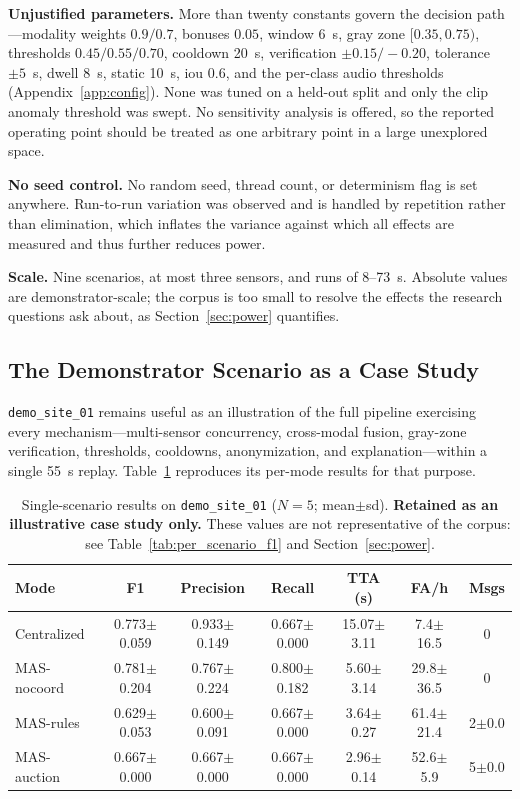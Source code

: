 \textbf{Unjustified parameters.} More than twenty constants govern the decision path---modality weights $0.9/0.7$, bonuses $0.05$, window 6~s, gray zone $[0.35,0.75)$, thresholds $0.45/0.55/0.70$, cooldown 20~s, verification $\pm0.15/-0.20$, tolerance $\pm5$~s, dwell 8~s, static 10~s, \gls{iou} 0.6, and the per-class audio thresholds (Appendix~\ref{app:config}). None was tuned on a held-out split and only the \gls{clip} anomaly threshold was swept. No sensitivity analysis is offered, so the reported operating point should be treated as one arbitrary point in a large unexplored space.

\textbf{No seed control.} No random seed, thread count, or determinism flag is set anywhere. Run-to-run variation was observed and is handled by repetition rather than elimination, which inflates the variance against which all effects are measured and thus further reduces power.

\textbf{Scale.} Nine scenarios, at most three sensors, and runs of 8--73~s. Absolute values are demonstrator-scale; the corpus is too small to resolve the effects the research questions ask about, as Section~\ref{sec:power} quantifies.

\subsection{The Demonstrator Scenario as a Case Study}
\label{sec:demo_case}

\texttt{demo\_site\_01} remains useful as an illustration of the full pipeline exercising every mechanism---multi-sensor concurrency, cross-modal fusion, gray-zone verification, thresholds, cooldowns, anonymization, and explanation---within a single 55~s replay. Table~\ref{tab:ablation} reproduces its per-mode results for that purpose.

\begin{table}[H]
	\centering
	\caption{Single-scenario results on \texttt{demo\_site\_01} ($N=5$; mean$\pm$sd). \textbf{Retained as an illustrative case study only.} These values are not representative of the corpus: see Table~\ref{tab:per_scenario_f1} and Section~\ref{sec:power}.}
	\label{tab:ablation}
	\small
	\begin{tabular}{lcccccc}
		\toprule
		\textbf{Mode} & \textbf{F1}     & \textbf{Precision} & \textbf{Recall} & \textbf{TTA (s)} & \textbf{FA/h} & \textbf{Msgs} \\
		\midrule
		Centralized   & 0.773$\pm$0.059 & 0.933$\pm$0.149    & 0.667$\pm$0.000 & 15.07$\pm$3.11   & 7.4$\pm$16.5  & 0             \\
		MAS-nocoord   & 0.781$\pm$0.204 & 0.767$\pm$0.224    & 0.800$\pm$0.182 & 5.60$\pm$3.14    & 29.8$\pm$36.5 & 0             \\
		MAS-rules     & 0.629$\pm$0.053 & 0.600$\pm$0.091    & 0.667$\pm$0.000 & 3.64$\pm$0.27    & 61.4$\pm$21.4 & 2$\pm$0.0     \\
		MAS-auction   & 0.667$\pm$0.000 & 0.667$\pm$0.000    & 0.667$\pm$0.000 & 2.96$\pm$0.14    & 52.6$\pm$5.9  & 5$\pm$0.0     \\
		\bottomrule
	\end{tabular}
\end{table}

